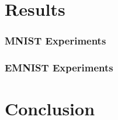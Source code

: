 \documentclass[a4paper,pt12]{article}
\begin{document}
\section{Results}

\subsubsection{MNIST Experiments}

\subsubsection{EMNIST Experiments}

\section{Conclusion}


%
%


\nocite{*}

\end{document}
